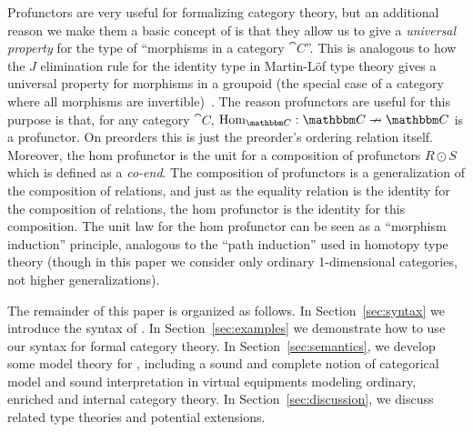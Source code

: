 \documentclass{llncs}
\begin{document}

Profunctors are very useful for formalizing category theory, but an
additional reason we make them a basic concept of \vett{} is that they
allow us to give a \emph{universal property} for the type of ``morphisms
in a category ${\cat C}$''.  This is analogous to how the $J$
elimination rule for the identity type in Martin-L\"of type theory gives
a universal property for morphisms in a groupoid (the special case of a
category where all morphisms are
invertible)~\cite{hofmann98groupoid,awodeywarren09identity,voevodsky06homotopy}. The reason
profunctors are useful for this purpose is that, for any category $\cat
C$, $\text{Hom}_{\cat C} : \cat C \pto \cat C$ is a profunctor. On
preorders this is just the preorder's ordering relation
itself. Moreover, the hom profunctor is the unit for a composition of
profunctors $R \odot S$ which is defined as a \emph{co-end}.
The composition of profunctors is a generalization of the composition of
relations, and just as the equality relation is the identity for the
composition of relations, the hom profunctor is the identity for this
composition.  The unit law for the hom profunctor can be seen as a
``morphism induction'' principle, analogous to the ``path induction''
used in homotopy type theory (though in this paper we consider only
ordinary 1-dimensional categories, not higher generalizations).

The remainder of this paper is organized as follows.  
In Section~\ref{sec:syntax} we introduce the syntax of \vett{}.  In
Section~\ref{sec:examples} we demonstrate how to use our syntax for formal
category theory.  In Section~\ref{sec:semantics}, we develop some model theory
for \vett{}, including a sound and complete notion of categorical model
and sound interpretation in virtual equipments modeling ordinary,
enriched and internal category theory.  In Section~\ref{sec:discussion}, we
discuss related type theories and potential extensions.
\end{document}
